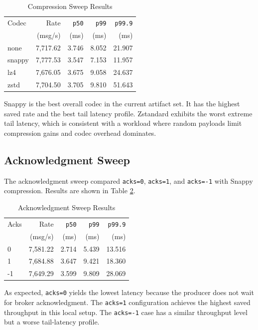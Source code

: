 \documentclass[conference]{IEEEtran}
\begin{document}
\begin{table}[t]
\caption{Compression Sweep Results}
\label{tab:compression}
\centering
\begin{tabular}{lrrrr}
\toprule
Codec & Rate & \texttt{p50} & \texttt{p99} & \texttt{p99.9} \\
 & (msg/s) & (ms) & (ms) & (ms) \\
\midrule
none & 7{,}717.62 & 3.746 & 8.052 & 21.907 \\
snappy & 7{,}777.53 & 3.547 & 7.153 & 11.957 \\
lz4 & 7{,}676.05 & 3.675 & 9.058 & 24.637 \\
zstd & 7{,}704.50 & 3.705 & 9.810 & 51.643 \\
\bottomrule
\end{tabular}
\end{table}

Snappy is the best overall codec in the current artifact set. It has the highest saved rate and the best tail latency profile. Zstandard exhibits the worst extreme tail latency, which is consistent with a workload where random payloads limit compression gains and codec overhead dominates.

\subsection{Acknowledgment Sweep}
The acknowledgment sweep compared \texttt{acks=0}, \texttt{acks=1}, and \texttt{acks=-1} with Snappy compression. Results are shown in Table \ref{tab:acks}.

\begin{table}[t]
\caption{Acknowledgment Sweep Results}
\label{tab:acks}
\centering
\begin{tabular}{lrrrr}
\toprule
Acks & Rate & \texttt{p50} & \texttt{p99} & \texttt{p99.9} \\
 & (msg/s) & (ms) & (ms) & (ms) \\
\midrule
0 & 7{,}581.22 & 2.714 & 5.439 & 13.516 \\
1 & 7{,}684.88 & 3.647 & 9.421 & 18.360 \\
-1 & 7{,}649.29 & 3.599 & 9.809 & 28.069 \\
\bottomrule
\end{tabular}
\end{table}

As expected, \texttt{acks=0} yields the lowest latency because the producer does not wait for broker acknowledgment. The \texttt{acks=1} configuration achieves the highest saved throughput in this local setup. The \texttt{acks=-1} case has a similar throughput level but a worse tail-latency profile.
\end{document}
